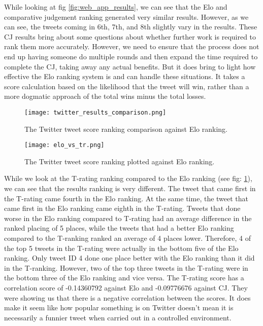 	While looking at fig \ref{fig:web_app_results}, we can see that the Elo and comparative judgement ranking generated very similar results. However, as we can see, the tweets coming in 6th, 7th, and 8th slightly vary in the results. These CJ results bring about some questions about whether further work is required to rank them more accurately. However, we need to ensure that the process does not end up having someone do multiple rounds and then expand the time required to complete the CJ, taking away any actual benefits. But it does bring to light how effective the Elo ranking system is and can handle these situations. It takes a score calculation based on the likelihood that the tweet will win, rather than a more dogmatic approach of the total wins minus the total losses.
	
	\begin{figure}[t]
		\centering
		\texttt{[image: twitter\_results\_comparison.png]}
		\caption{The Twitter tweet score ranking comparison against Elo ranking.}
		\label{fig:twitter_results_comparison}
		
	\end{figure}

	\begin{figure}[t]
		\centering
		\texttt{[image: elo\_vs\_tr.png]}
		\caption{The Twitter tweet score ranking plotted against Elo ranking.}
		\label{fig:elo_vs_tranking}
		
	\end{figure}

	While we look at the T-rating ranking compared to the Elo ranking (see fig: \ref{fig:twitter_results_comparison}), we can see that the results ranking is very different. The tweet that came first in the T-rating came fourth in the Elo ranking. At the same time, the tweet that came first in the Elo ranking came eighth in the T-rating.  Tweets that done worse in the Elo ranking compared to T-rating had an average difference in the ranked placing of 5 places, while the tweets that had a better Elo ranking compared to the T-ranking ranked an average of 4 places lower. Therefore, 4 of the top 5 tweets in the T-rating were actually in the bottom five of the Elo ranking. Only tweet ID 4 done one place better with the Elo ranking than it did in the T-ranking. However, two of the top three tweets in the T-rating were in the bottom three of the Elo ranking and vice versa. The T-rating score has a correlation score of -0.14360792 against Elo and -0.09776676 against CJ. They were showing us that there is a negative correlation between the scores. It does make it seem like how popular something is on Twitter doesn't mean it is necessarily a funnier tweet when carried out in a controlled environment.
	
